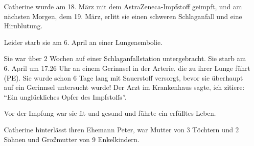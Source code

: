 

Catherine wurde am 18. März mit dem AstraZeneca-Impfstoff geimpft, und am nächsten Morgen, dem 19. März, erlitt sie einen schweren Schlaganfall und eine Hirnblutung.

Leider starb sie am 6. April an einer Lungenembolie.

Sie war über 2 Wochen auf einer Schlaganfallstation untergebracht. Sie starb am 6. April um 17.26 Uhr an einem Gerinnsel in der Arterie, die zu ihrer Lunge führt (PE). Sie wurde schon 6 Tage lang mit Sauerstoff versorgt, bevor sie überhaupt auf ein Gerinnsel untersucht wurde! Der Arzt im Krankenhaus sagte, ich zitiere: “Ein unglückliches Opfer des Impfstoffs”.

Vor der Impfung war sie fit und gesund und führte ein erfülltes Leben.

Catherine hinterlässt ihren Ehemann Peter, war Mutter von 3 Töchtern und 2 Söhnen und Großmutter von 9 Enkelkindern.
